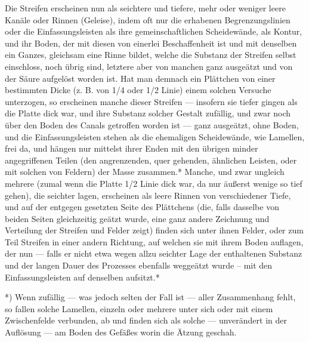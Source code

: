 \documentclass[a4paper, 11pt, oneside, german]{article}
\begin{document}
Die Streifen erscheinen nun als seichtere und tiefere, mehr oder weniger leere Kanäle oder Rinnen (Geleise), indem oft nur die erhabenen Begrenzungslinien oder die Einfassungsleisten als ihre gemeinschaftlichen Scheidewände, als Kontur, und ihr Boden, der mit diesen von einerlei Beschaffenheit ist und mit denselben ein Ganzes, gleichsam eine Rinne bildet, welche die Substanz der Streifen selbst einschloss, noch übrig sind, letztere aber von manchen ganz ausgeätzt und von der Säure aufgelöst worden ist. Hat man demnach ein Plättchen von einer bestimmten Dicke (z. B. von 1/4 oder 1/2 Linie) einem solchen Versuche unterzogen, so erscheinen manche dieser Streifen --- insofern sie tiefer gingen als die Platte dick war, und ihre Substanz solcher Gestalt zufällig, und zwar noch über den Boden des Canals getroffen worden ist --- ganz ausgeätzt, ohne Boden, und die Einfassungsleisten stehen als die ehemaligen Scheidewände, wie Lamellen, frei da, und hängen nur mittelst ihrer Enden mit den übrigen minder angegriffenen Teilen (den angrenzenden, quer gehenden, ähnlichen Leisten, oder mit solchen von Feldern) der Masse zusammen.* Manche, und zwar ungleich mehrere (zumal wenn die Platte 1/2 Linie dick war, da nur äußerst wenige so tief gehen), die seichter lagen, erscheinen als leere Rinnen von verschiedener Tiefe, und auf der entgegen gesetzten Seite des Plättchens (die, falls dasselbe von beiden Seiten gleichzeitig geätzt wurde, eine ganz andere Zeichnung und Verteilung der Streifen und Felder zeigt) finden sich unter ihnen Felder, oder zum Teil Streifen in einer andern Richtung, auf welchen sie mit ihrem Boden auflagen, der nun --- falls er nicht etwa wegen allzu seichter Lage der enthaltenen Substanz und der langen Dauer des Prozesses ebenfalls weggeätzt wurde -- mit den Einfassungsleisten auf denselben aufsitzt.*

*) Wenn zufällig --- was jedoch selten der Fall ist --- aller Zusammenhang fehlt, so fallen solche Lamellen, einzeln oder mehrere unter sich oder mit einem Zwischenfelde verbunden, ab und finden sich als solche --- unverändert in der Auflösung --- am Boden des Gefäßes worin die Ätzung geschah.
\end{document}
